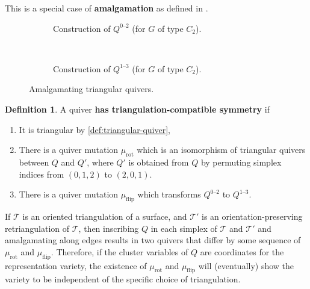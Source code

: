 \documentclass{amsart}
\theoremstyle{plain}
\theoremstyle{definition}
\newtheorem{definition}[theorem]{Definition}
\theoremstyle{remark}
\newcommand{\Qdv}{Q^{0\text{--}2}}
\newcommand{\Qdh}{Q^{1\text{--}3}}
\newcommand{\defined}[1]{\textbf{#1}}
\newcommand{\triang}{\mathcal{T}}
\newcommand{\muflip}{{\mu_{\text{flip}}}}
\newcommand{\murot}{{\mu_{\text{rot}}}}
\begin{document}
  This is a special case of \defined{amalgamation} as defined in
  \cite[\S 2.2]{fockgoncharov2006_2}.

  \begin{figure}[h]
    \centering
    \begin{subfigure}[t]{0.40\textwidth}
      \centering 

      \caption{Construction of $\Qdv$ (for $G$ of type $C_2$).
        \label{fig:dv-construction}
      }
    \end{subfigure}
    ~ \hspace{0.05\textwidth} ~
    \begin{subfigure}[t]{0.40\textwidth}
      \centering 

      \caption{Construction of $\Qdh$ (for $G$ of type $C_2$).
        \label{fig:dh-construction}
      }
    \end{subfigure}
    \caption{Amalgamating triangular quivers.}
  \end{figure}

  \begin{definition}
    \label{def:tcs}
    A quiver \defined{has triangulation-compatible symmetry} if
    \begin{enumerate}
    \item
      \label{def:tcs-1}
      It is triangular by \cref{def:triangular-quiver},
    \item
      \label{def:tcs-rot}
      There is a quiver mutation $\murot$ which is an isomorphism of
      triangular quivers between $Q$ and $Q'$, where $Q'$ is obtained
      from $Q$ by permuting simplex indices from $(0,1,2)$ to $(2,0,1)$.
    \item
      \label{def:tcs-flip}
      There is a quiver mutation $\muflip$ which transforms $\Qdv$ to
      $\Qdh$.
    \end{enumerate}
  \end{definition}

  If $\triang$ is an oriented triangulation of a surface, and $\triang'$
  is an orientation-preserving retriangulation of $\triang$, then
  inscribing $Q$ in each simplex of $\triang$ and $\triang'$ and
  amalgamating along edges results in two quivers that differ by some
  sequence of $\murot$ and $\muflip$. Therefore, if the cluster
  variables of $Q$ are coordinates for the representation variety, the
  existence of $\murot$ and $\muflip$ will (eventually) show the variety
  to be independent of the specific choice of triangulation.
\end{document}

